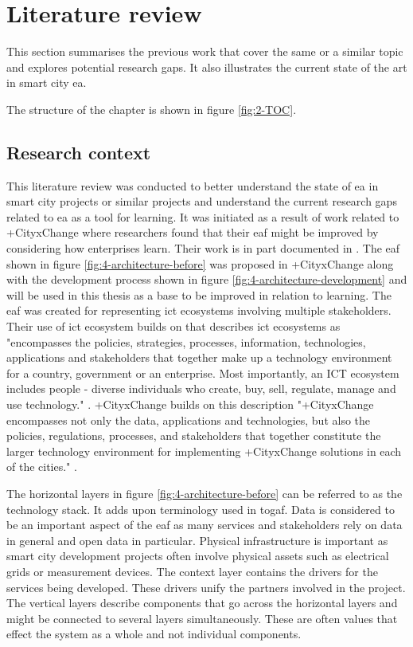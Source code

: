 \chapter{Literature review} %
\label{chap:literature}

This section summarises the previous work that cover the same or a similar topic and explores potential research gaps. It also illustrates the current state of the art in smart city \gls{ea}.

The structure of the chapter is shown in figure \ref{fig:2-TOC}.
\section{Research context}


This literature review was conducted to better understand the state of \gls{ea} in smart city projects or similar projects and understand the current research gaps related to \gls{ea} as a tool for learning. It was initiated as a result of work related to +CityxChange where researchers found that their \gls{eaf} might be improved by considering how enterprises learn. Their work is in part documented in \cite{cityxchange}. 
The \gls{eaf} shown in figure \ref{fig:4-architecture-before} was proposed in +CityxChange along with the development process shown in figure \ref{fig:4-architecture-development} and will be used in this thesis as a base to be improved in relation to learning. 
The \gls{eaf} was created for representing \glspl{ict ecosystem} involving multiple stakeholders. Their use of \gls{ict ecosystem} builds on \cite{ictecosystem} that describes \glspl{ict ecosystem} as "encompasses the policies, strategies, processes, information, technologies, applications and stakeholders that together make up a technology environment for a country, government or an enterprise. Most importantly, an ICT ecosystem includes people - diverse individuals who create, buy, sell, regulate, manage and use technology." \cite[p.~3]{ictecosystem}. +CityxChange builds on this description "+CityxChange encompasses not only the data, applications and technologies, but also the policies, regulations, processes, and stakeholders that together constitute the larger technology environment for implementing +CityxChange solutions in each of the cities." \cite[p.~117]{10.1007/978-3-030-22482-0_9}.

The horizontal layers in figure \ref{fig:4-architecture-before} can be referred to as the technology stack. It adds upon terminology used in \gls{togaf}. Data is considered to be an important aspect of the \gls{eaf} as many services and stakeholders rely on data in general and open data in particular. Physical infrastructure is important as smart city development projects often involve physical assets such as electrical grids or measurement devices. 
The context layer contains the drivers for the services being developed. These drivers unify the partners involved in the project. 
The vertical layers describe components that go across the horizontal layers and might be connected to several layers simultaneously. These are often values that effect the system as a whole and not individual components. 

